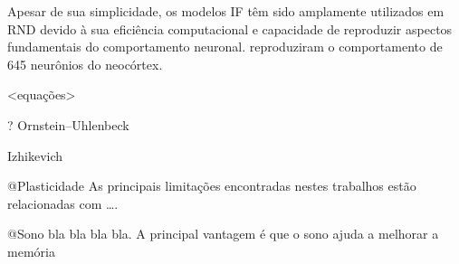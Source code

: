 Apesar de sua simplicidade, os modelos IF têm sido amplamente utilizados em RND devido à sua eficiência computacional e capacidade
de reproduzir aspectos fundamentais do comportamento neuronal. \cite{teeterGeneralized2018} reproduziram o comportamento de 645
neurônios do neocórtex.
\cite{gerstnerHow2009}

<equações>

? Ornstein–Uhlenbeck

Izhikevich


@Plasticidade As principais limitações encontradas nestes trabalhos estão relacionadas com ….


@Sono bla bla bla bla. A principal vantagem é que o sono ajuda a melhorar a memória
